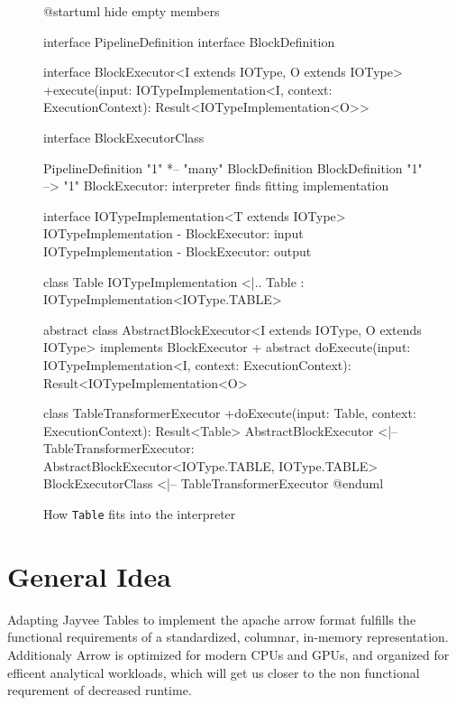\begin{figure}
	\begin{plantuml}
		@startuml
		hide empty members

		interface PipelineDefinition
		interface BlockDefinition

		interface BlockExecutor<I extends IOType, O extends IOType> {
				+execute(input: IOTypeImplementation<I\>, context: ExecutionContext): Result<IOTypeImplementation<O>>
			}

		interface BlockExecutorClass {}

		PipelineDefinition "1" *-- "many" BlockDefinition
		BlockDefinition "1" --> "1" BlockExecutor: interpreter finds fitting implementation %

		interface IOTypeImplementation<T extends IOType>
		IOTypeImplementation - BlockExecutor: input
		IOTypeImplementation - BlockExecutor: output

		class Table
		IOTypeImplementation <|.. Table : IOTypeImplementation<IOType.TABLE>

		abstract class AbstractBlockExecutor<I extends IOType, O extends IOType> implements BlockExecutor {
		+ {abstract} doExecute(input: IOTypeImplementation<I\>, context: ExecutionContext): Result<IOTypeImplementation<O\>>
		}

		class TableTransformerExecutor {
				+doExecute(input: Table, context: ExecutionContext): Result<Table>
			}
		AbstractBlockExecutor <|-- TableTransformerExecutor: AbstractBlockExecutor<IOType.TABLE, IOType.TABLE>
		BlockExecutorClass <|-- TableTransformerExecutor
		@enduml
	\end{plantuml}
	\caption{How \Verb|Table| fits into the interpreter} %
	\label{fig:prev_sit}
\end{figure}

\section{General Idea}
\label{section:General Idea}

Adapting Jayvee Tables to implement the apache arrow format fulfills the functional requirements of a standardized, columnar, in-memory representation.
Additionaly Arrow is optimized for modern CPUs and GPUs, and organized for efficent analytical workloads, which will get us closer to the non functional requrement of decreased runtime. %

